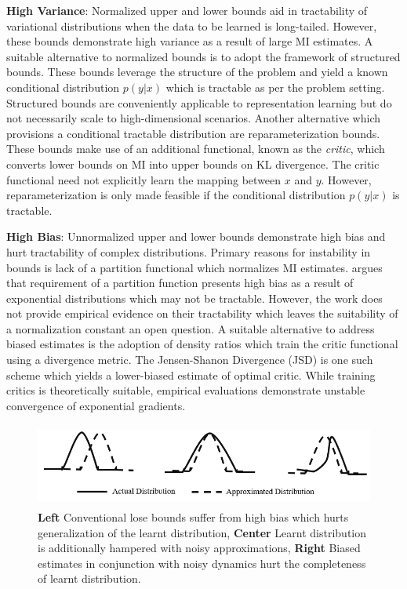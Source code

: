 \documentclass{article}
\begin{document}
\textbf{High Variance}: Normalized upper and lower bounds aid in tractability of variational distributions when the data to be learned is long-tailed. However, these bounds demonstrate high variance as a result of large MI estimates. A suitable alternative to normalized bounds is to adopt the framework of structured bounds. These bounds leverage the structure of the problem and yield a known conditional distribution $p(y|x)$ which is tractable as per the problem setting. Structured bounds are conveniently applicable to representation learning \cite{cpc,variational} but do not necessarily scale to high-dimensional scenarios. Another alternative which provisions a conditional tractable distribution are reparameterization bounds. These bounds make use of an additional functional, known as the \textit{critic}, which converts lower bounds on MI into upper bounds on KL divergence. The critic functional need not explicitly learn the mapping between $x$ and $y$. However, reparameterization is only made feasible if the conditional distribution $p(y|x)$ is tractable. 

\textbf{High Bias}: Unnormalized upper and lower bounds demonstrate high bias and hurt tractability of complex distributions. Primary reasons for instability in bounds is lack of a partition functional which normalizes MI estimates. \cite{variational} argues that requirement of a partition function presents high bias as a result of exponential distributions which may not be tractable. However, the work does not provide empirical evidence on their tractability which leaves the suitability of a normalization constant an open question. A suitable alternative to address biased estimates is the adoption of density ratios which train the critic functional using a divergence metric. The Jensen-Shanon Divergence (JSD) is one such scheme which yields a lower-biased estimate of optimal critic. While training critics is theoretically suitable, empirical evaluations \cite{variational} demonstrate unstable convergence of exponential gradients. 

\begin{figure}[ht]
  \centering
  \includegraphics[height=2.75cm,width=13cm]{dist.PNG}
  \caption{\textbf{Left} Conventional lose bounds suffer from high bias which hurts generalization of the learnt distribution, \textbf{Center} Learnt distribution is additionally hampered with noisy approximations, \textbf{Right} Biased estimates in conjunction with noisy dynamics hurt the completeness of learnt distribution.}
  \label{fig:dist}
\end{figure}
\end{document}
